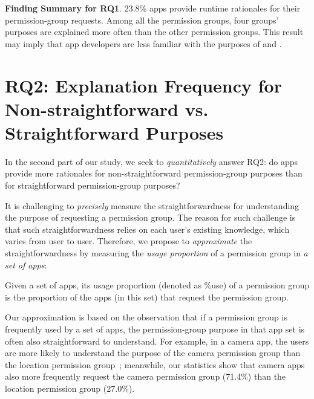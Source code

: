 {\bf Finding Summary for RQ1}. 23.8\% apps provide runtime rationales for their permission-group requests. 
Among all the permission groups, four groups' purposes are explained more often than the other permission groups. This result may imply that app developers are less familiar with the purposes of  and . 

\section{RQ2: Explanation Frequency for Non-straightforward vs. Straightforward Purposes}
\label{sec:rq2}

In the second part of our study, we seek to \emph{quantitatively} answer RQ2: 
do apps provide more rationales for non-straightforward permission-group purposes than for straightforward permission-group purposes? 

It is challenging to \emph{precisely} measure the straightforwardness for understanding the purpose of requesting a permission group. 
The reason for such challenge is that such straightforwardness relies on each user's existing knowledge, which varies from user to user. Therefore, we propose to \emph{approximate} the straightforwardness by measuring the \emph{usage proportion} of a permission group in \emph{a set of apps}:

\begin{mydef}
Given a set of apps, its usage proportion (denoted as  \textsf{\%use}) of a permission group  is the proportion of the apps (in this set) that request the permission group. 
\label{def:usagefreq}
\end{mydef}

Our approximation is based on the observation that if a permission group is frequently used by a set of apps, the permission-group purpose in that app set is often also straightforward to understand. 
For example, in a camera app, the users are more likely to understand the purpose of the camera permission group than the location permission group~\cite{shouldshow}; 
meanwhile, our statistics show that camera apps also more frequently request the camera permission group (71.4\%) than the location permission group (27.0\%). 

